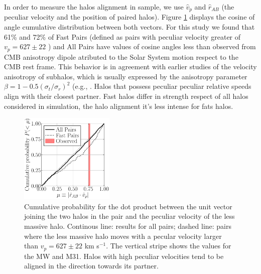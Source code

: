 \documentclass[usenatbib]{mnras}
\newcommand{\kms}{{\ifmmode{\ {\rm km\, {s}^{-1}}}\else{\ km s$^{-1}$}\fi}}
\begin{document}
In order to measure the halos alignment in sample, we use $\hat v_p$ and $\hat r_{AB}$ (the peculiar velocity and the position of paired halos). Figure \ref{fig:alignment} displays the cosine of angle cumulative distribution between both vectors. For this study we found that 61\% and 72\% of Fast Pairs (defined as pairs with peculiar velocity greater of $v_p=627\pm22$ \kms) and All Pairs have values of cosine angles less than observed from CMB anisotropy dipole atributed to the Solar System motion respect to the CMB rest frame. This behavior is in agreement with earlier studies of the velocity anisotropy of subhalos, which is usually expressed by the anisotropy parameter $\beta=1-0.5(\sigma_{t}/\sigma_{r})^{2}$ (e.g., \cite{1987gady.book.....B}. Halos that possess peculiar peculiar relative speeds align with their closest partner. Fast halos differ in strength respect of all halos considered in simulation, the halo alignment it's less intense for fats halos.

\begin{figure}
\begin{center}
  \includegraphics[width=0.4\textwidth]{cumulative_alignment_06.pdf}
\end{center}
\caption{Cumulative probability for the dot product between the unit vector joining the two halos in the pair and the peculiar velocity of the less massive halo.  Continous line: results for all pairs; dashed line: pairs where the less massive halo moves with a pecular velocity larger than $v_p=627\pm22$ km s$^{-1}$. The vertical stripe shows the values for the MW and M31. Halos with high peculiar velocities tend to be aligned in the direction towards its partner.}
\label{fig:alignment}
\end{figure}
\end{document}
